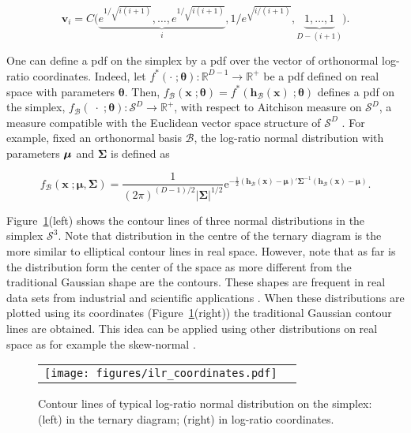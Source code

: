\documentclass[12pt, a4paper]{article}
\newcommand{\m}[1]{\boldsymbol{#1}}
\begin{document}
\[
\textbf{v}_i = C\Big( \underbrace{e^{1/\sqrt{i(i+1)}}, \dots, e^{1/\sqrt{i(i+1)}}}_{i}, 1/e^{\sqrt{ i/(i+1)}}, \underbrace{1, \dots, 1}_{D-(i+1)} \Big).
\]


One can define a pdf on the simplex by a pdf over the vector of orthonormal log-ratio coordinates. Indeed, let $f^*(\cdot \;; \m\theta) : \mathbb{R}^{D-1} \rightarrow \mathbb{R}^+$ be a pdf defined on real space with parameters $\m\theta$. Then, $f_\mathcal{B}(\mathbf{x}\;; \m\theta) = f^*(\mathbf{h}_\mathcal{B}(\textbf{x})\;; \m\theta)$ defines a pdf on the simplex, $f_\mathcal{B}(\;\cdot\;; \m\theta): \mathcal{S}^D \rightarrow \mathbb{R}^+$, with respect to Aitchison measure on $\mathcal{S}^D$, a measure compatible with the Euclidean vector space structure of $\mathcal{S}^D$ \citep{mateu2013normal}. For example, fixed an orthonormal basis $\mathcal{B}$, the log-ratio normal distribution with parameters $\mbox{\boldmath \(\mu\)}$ and $\mathbf{\Sigma}$ is defined as

\begin{equation}\label{eq:densSNormal}
f_\mathcal{B}(\mathbf{x}\;; \m\mu, \m\Sigma) =\frac{1}{(2\pi)^{(D-1)/2} |\mathbf{\Sigma}|^{1/2}} \text{e}^{ -{\frac{1}{2}} \left(\mathbf{h}_\mathcal{B}(\textbf{x})- \m\mu \right)' \mathbf{\Sigma}^{-1} \left( \mathbf{h}_\mathcal{B}(\textbf{x})- \m\mu \right)}.
\end{equation}

Figure~\ref{fig01}(left) shows the contour lines of three normal distributions in the simplex $\mathcal{S}^3$. Note that distribution in the centre of the ternary diagram is the more similar to elliptical contour lines in real space. However, note that as far is
the distribution form the center of the space as more different from the traditional Gaussian shape are the contours. These shapes are frequent in real data sets from industrial and scientific applications \citep{buccianti2011natural,vives2014individual}.
When these distributions are plotted using its coordinates (Figure~\ref{fig01}(right)) the traditional Gaussian contour lines are obtained. This idea can be applied using other distributions on real space as for example the skew-normal  \citep{mateu2007skew}.


\begin{figure}[thbp]
\begin{center}
\begin{tabular}{cc}
  \texttt{[image: figures/ilr\_coordinates.pdf]} \\
 \end{tabular}
 \caption{Contour lines of typical log-ratio normal distribution on the simplex: (left) in the ternary diagram; (right) in log-ratio coordinates. }\label{fig01}
\end{center}
\end{figure}
\end{document}
